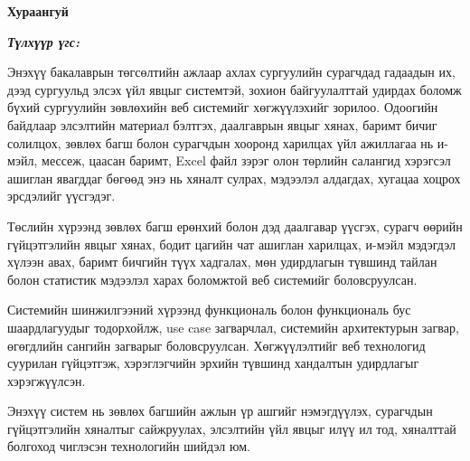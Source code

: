 

\begin{center}
{\scshape\Large \univname\par} %
{\scshape\large \facname\par}\vspace{0.5cm} %
{\huge\textbf{{Хураангуй}} \par}
\bigskip
{\Large{\ttitle} \par} %
\bigskip

{\normalsize \shortname \par} %
\addressname
\end{center}

\textit{\textbf{Түлхүүр үгс: \keywordnames}}
\bigskip

Энэхүү бакалаврын төгсөлтийн ажлаар ахлах сургуулийн сурагчдад гадаадын их, дээд сургуульд элсэх үйл явцыг системтэй, зохион байгуулалттай удирдах боломж бүхий сургуулийн зөвлөхийн веб системийг хөгжүүлэхийг зорилоо. Одоогийн байдлаар элсэлтийн материал бэлтгэх, даалгаврын явцыг хянах, баримт бичиг солилцох, зөвлөх багш болон сурагчдын хооронд харилцах үйл ажиллагаа нь и-мэйл, мессеж, цаасан баримт, Excel файл зэрэг олон төрлийн салангид хэрэгсэл ашиглан явагддаг бөгөөд энэ нь хяналт сулрах, мэдээлэл алдагдах, хугацаа хоцрох эрсдэлийг үүсгэдэг.

Төслийн хүрээнд зөвлөх багш ерөнхий болон дэд даалгавар үүсгэх, сурагч өөрийн гүйцэтгэлийн явцыг хянах, бодит цагийн чат ашиглан харилцах, и-мэйл мэдэгдэл хүлээн авах, баримт бичгийн түүх хадгалах, мөн удирдлагын түвшинд тайлан болон статистик мэдээлэл харах боломжтой веб системийг боловсруулсан.

Системийн шинжилгээний хүрээнд функциональ болон функциональ бус шаардлагуудыг тодорхойлж, use case загварчлал, системийн архитектурын загвар, өгөгдлийн сангийн загварыг боловсруулсан. Хөгжүүлэлтийг веб технологид суурилан гүйцэтгэж, хэрэглэгчийн эрхийн түвшинд хандалтын удирдлагыг хэрэгжүүлсэн.

Энэхүү систем нь зөвлөх багшийн ажлын үр ашгийг нэмэгдүүлэх, сурагчдын гүйцэтгэлийн хяналтыг сайжруулах, элсэлтийн үйл явцыг илүү ил тод, хяналттай болгоход чиглэсэн технологийн шийдэл юм.